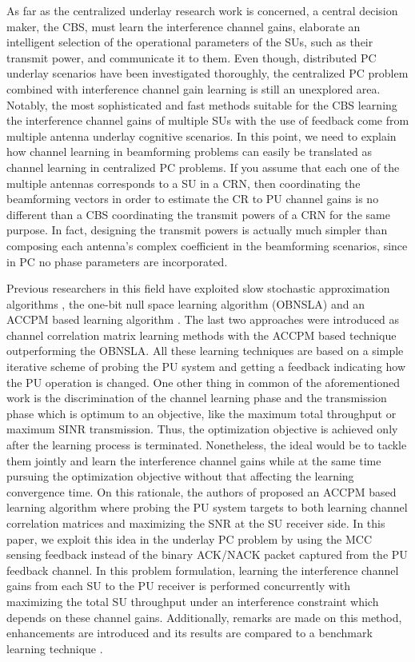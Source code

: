 \documentclass[journal]{IEEEtran}
\begin{document}
As far as the centralized underlay research work is concerned, a central decision maker, the CBS, must learn the interference channel gains, elaborate an intelligent selection of the operational parameters of the SUs, such as their transmit power, and communicate it to them. Even though, distributed PC underlay scenarios have been investigated thoroughly, the centralized PC problem combined with interference channel gain learning is still an unexplored area. Notably, the most sophisticated and fast methods suitable for the CBS learning the interference channel gains of multiple SUs with the use of feedback come from multiple antenna underlay cognitive scenarios. In this point, we need to explain how channel learning in beamforming problems can easily be translated as channel learning in centralized PC problems. If you assume that each one of the multiple antennas corresponds to a SU in a CRN, then coordinating the beamforming vectors in order to estimate the CR to PU channel gains is no different than a CBS coordinating the transmit powers of a CRN for the same purpose. In fact, designing the transmit powers is actually much simpler than composing each antenna's complex coefficient in the beamforming scenarios, since in PC no phase parameters are incorporated.

Previous researchers in this field have exploited slow stochastic approximation algorithms \cite{biban79, biban84}, the one-bit null space learning algorithm (OBNSLA) \cite{biban72} and an ACCPM based learning algorithm \cite{biban78}. The last two approaches were introduced as channel correlation matrix learning methods with the ACCPM based technique outperforming the OBNSLA. All these learning techniques are based on a simple iterative scheme of probing the PU system and getting a feedback indicating how the PU operation is changed. One other thing in common of the aforementioned work is the discrimination of the channel learning phase and the transmission phase which is optimum to an objective, like the maximum total throughput or maximum SINR transmission. Thus, the optimization objective is achieved only after the learning process is terminated. Nonetheless, the ideal would be to tackle them jointly and learn the interference channel gains while at the same time pursuing the optimization objective without that affecting the learning convergence time. On this rationale, the authors of \cite{biban73} proposed an ACCPM based learning algorithm where probing the PU system targets to both learning channel correlation matrices and maximizing the SNR at the SU receiver side. In this paper, we exploit this idea in the underlay PC problem by using the MCC sensing feedback instead of the binary ACK/NACK packet captured from the PU feedback channel. In this problem formulation, learning the interference channel gains from each SU to the PU receiver is performed concurrently with maximizing the total SU throughput under an interference constraint which depends on these channel gains. Additionally, remarks are made on this method, enhancements are introduced and its results are compared to a benchmark learning technique \cite{biban80}.
\end{document}
